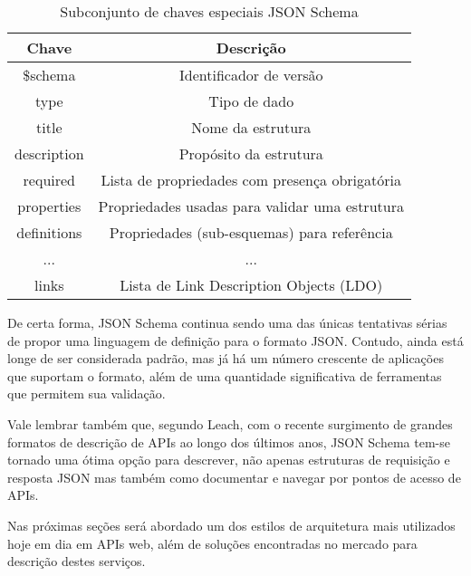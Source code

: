 \begin{table}[ht!]
  \centering
  \begin{tabular}{|c|c|}
    \hline
    Chave & Descrição \\
    \hline
    \$schema & Identificador de versão \\
    \hline
    type & Tipo de dado \\
    \hline
    title & Nome da estrutura \\
    \hline
    description & Propósito da estrutura \\
    \hline
    required & Lista de propriedades com presença obrigatória \\
    \hline
    properties & Propriedades usadas para validar uma estrutura \\
    \hline
    definitions & Propriedades (sub-esquemas) para referência \\
    \hline
    ... & ... \\
    \hline
    links & Lista de Link Description Objects (LDO) \\
    \hline
  \end{tabular}
  \caption{Subconjunto de chaves especiais JSON Schema}
\end{table}

De certa forma, JSON Schema continua sendo uma das únicas tentativas sérias de propor uma linguagem de definição para o formato JSON. Contudo, ainda está longe de ser considerada padrão, mas já há um número crescente de aplicações que suportam o formato, além de uma quantidade significativa de ferramentas que permitem sua validação. \cite{PezoaEtAl2016}

Vale lembrar também que, segundo Leach, com o recente surgimento de grandes formatos de descrição de APIs ao longo dos últimos anos, JSON Schema tem-se tornado uma ótima opção para descrever, não apenas estruturas de requisição e resposta JSON mas também como documentar e navegar por pontos de acesso de APIs. \cite{Leach2014}

Nas próximas seções será abordado um dos estilos de arquitetura mais utilizados hoje em dia em APIs web, além de soluções encontradas no mercado para descrição destes serviços.
